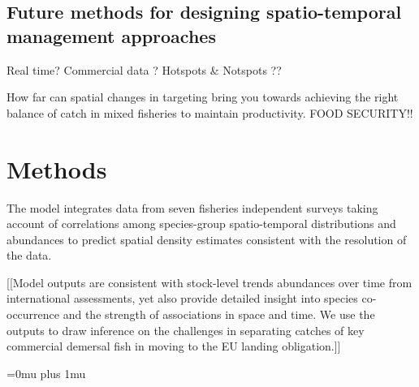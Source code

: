\documentclass{nature}
\begin{document}
\begin{linenumbers}
\subsection{Future methods for designing spatio-temporal management approaches}

Real time?  Commercial data ?  Hotspots \& Notspots ??

How far can spatial changes in targeting bring you towards achieving the right
balance of catch in mixed fisheries to maintain productivity. FOOD SECURITY!!

\section*{Methods}

The model integrates data from seven fisheries independent surveys taking
account of correlations among species-group spatio-temporal distributions and
abundances to predict spatial density estimates consistent with the resolution
of the data. 

[[Model outputs are consistent with stock-level trends abundances over time
from international assessments, yet also provide detailed insight into species
co-occurrence and the strength of associations in space and time.  We use the
outputs to draw inference on the challenges in separating catches of key
commercial demersal fish in moving to the EU landing obligation.]]



\end{linenumbers}
\newpage
\Urlmuskip=0mu plus 1mu\relax

\small{}



\end{document}
